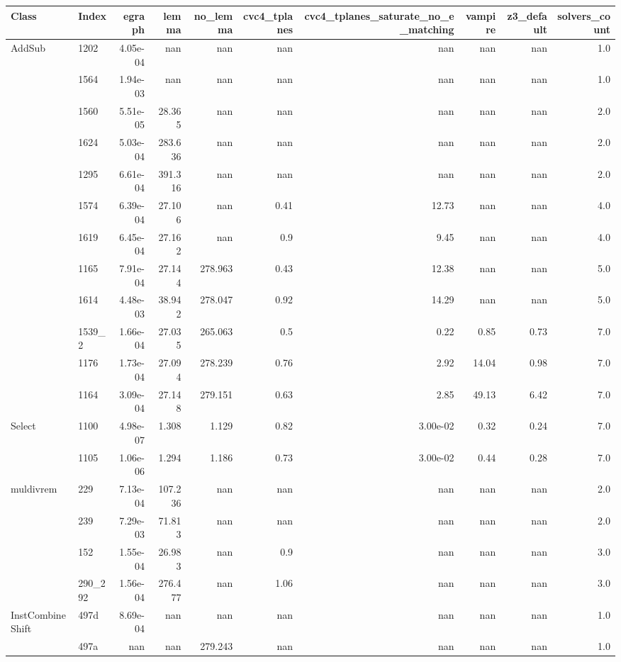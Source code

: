 \begin{tabular}{llrrrrrrrr}
\toprule
Class & Index & egraph & lemma & no\_lemma & cvc4\_tplanes & cvc4\_tplanes\_saturate\_no\_e\_matching & vampire & z3\_default & solvers\_count \\
\midrule
\multirow{12}{*}{AddSub}
&1202 & 4.05e-04 & nan & nan & nan & nan & nan & nan & 1.0 \\
&1564 & 1.94e-03 & nan & nan & nan & nan & nan & nan & 1.0 \\
&1560 & 5.51e-05 & 28.365 & nan & nan & nan & nan & nan & 2.0 \\
&1624 & 5.03e-04 & 283.636 & nan & nan & nan & nan & nan & 2.0 \\
&1295 & 6.61e-04 & 391.316 & nan & nan & nan & nan & nan & 2.0 \\
&1574 & 6.39e-04 & 27.106 & nan & 0.41 & 12.73 & nan & nan & 4.0 \\
&1619 & 6.45e-04 & 27.162 & nan & 0.9 & 9.45 & nan & nan & 4.0 \\
&1165 & 7.91e-04 & 27.144 & 278.963 & 0.43 & 12.38 & nan & nan & 5.0 \\
&1614 & 4.48e-03 & 38.942 & 278.047 & 0.92 & 14.29 & nan & nan & 5.0 \\
&1539\_2 & 1.66e-04 & 27.035 & 265.063 & 0.5 & 0.22 & 0.85 & 0.73 & 7.0 \\
&1176 & 1.73e-04 & 27.094 & 278.239 & 0.76 & 2.92 & 14.04 & 0.98 & 7.0 \\
&1164 & 3.09e-04 & 27.148 & 279.151 & 0.63 & 2.85 & 49.13 & 6.42 & 7.0 \\
\midrule
\multirow{2}{*}{Select}
&1100 & 4.98e-07 & 1.308 & 1.129 & 0.82 & 3.00e-02 & 0.32 & 0.24 & 7.0 \\
&1105 & 1.06e-06 & 1.294 & 1.186 & 0.73 & 3.00e-02 & 0.44 & 0.28 & 7.0 \\
\midrule
\multirow{4}{*}{muldivrem}
&229 & 7.13e-04 & 107.236 & nan & nan & nan & nan & nan & 2.0 \\
&239 & 7.29e-03 & 71.813 & nan & nan & nan & nan & nan & 2.0 \\
&152 & 1.55e-04 & 26.983 & nan & 0.9 & nan & nan & nan & 3.0 \\
&290\_292 & 1.56e-04 & 276.477 & nan & 1.06 & nan & nan & nan & 3.0 \\
\midrule
\multirow{2}{*}{InstCombineShift}
&497d & 8.69e-04 & nan & nan & nan & nan & nan & nan & 1.0 \\
&497a & nan & nan & 279.243 & nan & nan & nan & nan & 1.0 \\

\end{tabular}
